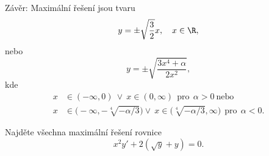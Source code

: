 \documentclass[answers]{exam}
\begin{document}
\begin{questions}
\begin{solution}
		Z\'av\v er: Maxim\'aln\'i \v re\v sen\'i jsou tvaru
		\begin{equation*}
			y=\pm\sqrt{\frac{3}{2}}x,\quad x\in\R,
		\end{equation*}
		nebo
		\begin{equation*}
		y=\pm\sqrt{\frac{3x^4+\alpha}{2x^2}},
		\end{equation*}
		kde 
		\begin{align*}
		x&\in(-\infty,0)\ \vee \ x\in(0,\infty)\ \ \mathrm{pro}\ \ \alpha>0\ \mathrm{nebo}\\
		x&\in\big(-\infty,-\sqrt[4]{-\alpha/3}\big)\vee\ x\in\big(\sqrt[4]{-\alpha/3},\infty\big) \ \ \mathrm{pro}\ \ \alpha<0.
		\end{align*}
	\end{solution}
	
	\question
	Najd\v ete v\v sechna maxim\'aln\'i \v re\v sen\'i rovnice
	\begin{equation*}
		x^2 y' + 2 \left( \sqrt{y} + y \right) = 0.
	\end{equation*}
	

\end{questions}
\end{document}

